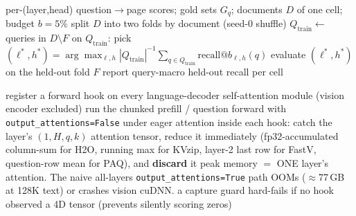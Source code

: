 \documentclass[11pt,letterpaper]{article}
\newcommand{\paq}{\textsc{PAQ}}
\newcommand{\paqt}{\textsc{PAQ-T}}
\begin{document}
\begin{algorithm}[t]
\caption{Expert-head selection with held-out-document CV (\paqt{}; gold-supervised selection on
the complementary fold, never on the scored documents)}
\label{alg:expert}
\begin{algorithmic}[1]
\Require per-(layer,head) question$\to$page scores; gold sets $G_q$; documents $D$ of one cell;
budget $b=5\%$
\State split $D$ into two folds by document (seed-0 shuffle)
  \State $Q_{\mathrm{train}}\gets$ queries in $D\setminus F$
  \State on $Q_{\mathrm{train}}$: pick
         $(\ell^*,h^*)=\arg\max_{\ell,h}|Q_{\mathrm{train}}|^{-1}
         \sum_{q\in Q_{\mathrm{train}}}\mathrm{recall}@b_{\ell,h}(q)$
  \State evaluate $(\ell^*,h^*)$ on the held-out fold $F$
\EndFor
\State report query-macro held-out recall per cell
\end{algorithmic}
\end{algorithm}

\begin{algorithm}[t]
\caption{OOM-safe per-layer-hook attention capture (the engineering that makes 64K scoring feasible)}
\label{alg:hooks}
\begin{algorithmic}[1]
\State register a forward hook on every language-decoder self-attention module (vision encoder excluded)
\State run the chunked prefill / question forward with \texttt{output\_attentions=False} under eager attention
\State inside each hook: catch the layer's $(1,H,q,k)$ attention tensor, reduce it immediately
       (fp32-accumulated column-sum for H2O, running max for KVzip, layer-2 last row for FastV,
       question-row mean for \paq), and \textbf{discard} it
\State peak memory $=$ ONE layer's attention. The naive all-layers
       \texttt{output\_attentions=True} path OOMs ($\approx$77\,GB at 128K text) or crashes vision cuDNN.
\State a capture guard hard-fails if no hook observed a 4D tensor (prevents silently scoring zeros)
\end{algorithmic}
\end{algorithm}
\end{document}
